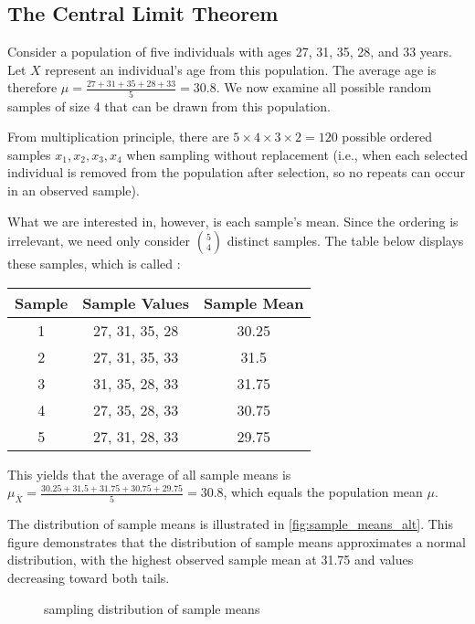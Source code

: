 \subsection{The Central Limit Theorem}

Consider a population of five individuals with ages 27, 31, 35, 28, and 33 years.
Let \( X \) represent an individual's age from this population.
The average age is therefore \( \mu = \frac{27 + 31 + 35 + 28 + 33}{5} = 30.8 \).
We now examine all possible random samples of size 4 that can be drawn from this population.

From multiplication principle, there are \( 5 \times 4 \times 3 \times 2 = 120 \) possible ordered samples \( x_1, x_2, x_3, x_4 \) when sampling without replacement (i.e., when each selected individual is removed from the population after selection, so no repeats can occur in an observed sample).

What we are interested in, however, is each sample's mean.
Since the ordering is irrelevant, we need only consider \( 5 \choose 4 \) distinct samples.
The table below displays these samples, which is called :
\begin{center}
\begin{tabular}{|c|c|c|}
\hline
\textbf{Sample} & \textbf{Sample Values} & \textbf{Sample Mean} \\ 
\hline
1 & 27, 31, 35, 28 & 30.25 \\
\hline
2 & 27, 31, 35, 33 & 31.5 \\
\hline
3 & 31, 35, 28, 33 & 31.75 \\
\hline
4 & 27, 35, 28, 33 & 30.75 \\
\hline
5 & 27, 31, 28, 33 & 29.75 \\
\hline
\end{tabular}
\end{center}
This yields that the average of all sample means is \( \mu_{\bar{X}} = \frac{30.25 + 31.5 + 31.75 + 30.75 + 29.75}{5} = 30.8 \),
which equals the population mean \( \mu \).

The distribution of sample means is illustrated in \autoref{fig:sample_means_alt}.
This figure demonstrates that the distribution of sample means approximates a normal distribution,
with the highest observed sample mean at 31.75 and values decreasing toward both tails.
\begin{figure}[t]
\begin{center}
\end{center}
\caption{sampling distribution of sample means}
\label{fig:sample_means_alt}
\end{figure}

